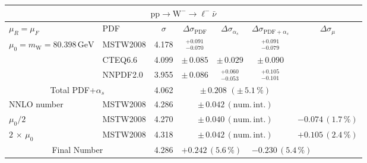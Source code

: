 \begin{table}[htb]
  \begin{center}
    \begin{tabular}{|l|l|c|c|c|c|c|}
      \hline
      
      \multicolumn{7}{|c|}{$\mathrm{pp}\to\mathrm{W}^-\to{\ell^-\bar{\nu}}$}\\ \hline
      $\mu_R=\mu_F$ & PDF & $\sigma$ & $\Delta\sigma_{\mathrm{PDF}}$ & $\Delta\sigma_{\alpha_s}$ & $\Delta\sigma_{\mathrm{PDF}+\alpha_s}$ & $\Delta\sigma_{\mu}$ \\ \hline\hline

      $\mu_0=m_\mathrm{W}=80.398\,\mathrm{GeV}$ & MSTW2008 & 4.178 & $^{+0.091}_{-0.070}$ &     &  $^{+0.091}_{-0.079}$    &     \\
                                                & CTEQ6.6  & 4.099 & $\pm\,0.085$ &  $\pm\,0.029$  &  $\pm\,0.090$       &     \\
                                                & NNPDF2.0 & 3.955 & $\pm\,0.086$ &  $^{+0.060}_{-0.053}$  & $^{+0.105}_{-0.101}$     &     \\ \hline\hline
      \multicolumn{2}{|c|}{Total PDF+$\alpha_s$}      &  4.062   & \multicolumn{3}{c|}{$\pm\,0.208\,\,(\pm\,5.1\,\%)$} & \\ \hline\hline
      NNLO number                               & MSTW2008 & 4.286 & \multicolumn{3}{c|}{$\pm\,0.042\,(\mathrm{num.\,int.})$} & \\
      $\mu_0/2$                                 & MSTW2008 & 4.270 & \multicolumn{3}{c|}{$\pm\,0.040\,(\mathrm{num.\,int.})$} & $-0.074\,(1.7\,\%)$\\ 
      $2\,\times\,\mu_0$                        & MSTW2008 & 4.318 & \multicolumn{3}{c|}{$\pm\,0.042\,(\mathrm{num.\,int.})$} & $+0.105\,(2.4\,\%)$\\ \hline\hline
      \multicolumn{2}{|c|}{Final Number} & 4.286 & \multicolumn{2}{l}{$+0.242\,(5.6\,\%)$} & \multicolumn{2}{l|}{$-0.230\,(5.4\,\%)$} \\


\hline 
\end{tabular}
\end{center}
\end{table} 


